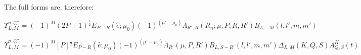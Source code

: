 The full forms are, therefore:

\begin{equation}
\varUpsilon_{L,M}^{u,\zeta\zeta'}=(-1)^{M}(2P+1)^{\frac{1}{2}}E_{P-R}(\hat{e};\mu_{0})(-1)^{(\mu'-\mu_{0})}\Lambda_{R',R}(R_{\hat{n}};\mu,P,R,R')B_{L,-M}(l,l',m,m')
\end{equation}

\begin{equation}
\bar{\varUpsilon}_{L,M}^{u,\zeta\zeta'}=(-1)^{M}[P]^{\frac{1}{2}}E_{P-R}(\hat{e};\mu_{0})(-1)^{(\mu'-\mu_{0})}\bar{\Lambda}_{R'}(\mu,P,R')B_{L,S-R'}(l,l',m,m')\Delta_{L,M}(K,Q,S)A_{Q,S}^{K}(t)
\end{equation}

